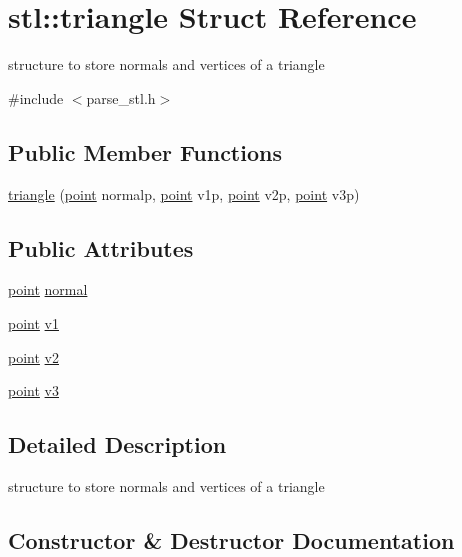 \hypertarget{structstl_1_1triangle}{}\section{stl\+:\+:triangle Struct Reference}
\label{structstl_1_1triangle}


structure to store normals and vertices of a triangle  




{\ttfamily \#include $<$parse\+\_\+stl.\+h$>$}

\subsection*{Public Member Functions}
\begin{DoxyCompactItemize}
\item 
\mbox{\hyperlink{structstl_1_1triangle_a21b54473d994da4eae217c4df12c8654}{triangle}} (\mbox{\hyperlink{structstl_1_1point}{point}} normalp, \mbox{\hyperlink{structstl_1_1point}{point}} v1p, \mbox{\hyperlink{structstl_1_1point}{point}} v2p, \mbox{\hyperlink{structstl_1_1point}{point}} v3p)
\end{DoxyCompactItemize}
\subsection*{Public Attributes}
\begin{DoxyCompactItemize}
\item 
\mbox{\hyperlink{structstl_1_1point}{point}} \mbox{\hyperlink{structstl_1_1triangle_ac17e971a0bd58456d74eb5507d1daa86}{normal}}
\item 
\mbox{\hyperlink{structstl_1_1point}{point}} \mbox{\hyperlink{structstl_1_1triangle_a8fda6f22f6e1f7064c3981696817e7f4}{v1}}
\item 
\mbox{\hyperlink{structstl_1_1point}{point}} \mbox{\hyperlink{structstl_1_1triangle_af767f5dd74a671bc24e3a246f241aad0}{v2}}
\item 
\mbox{\hyperlink{structstl_1_1point}{point}} \mbox{\hyperlink{structstl_1_1triangle_a641b217506153b32a9318535a60b6131}{v3}}
\end{DoxyCompactItemize}


\subsection{Detailed Description}
structure to store normals and vertices of a triangle 

\subsection{Constructor \& Destructor Documentation}
\mbox{\label{structstl_1_1triangle_a21b54473d994da4eae217c4df12c8654}} 
